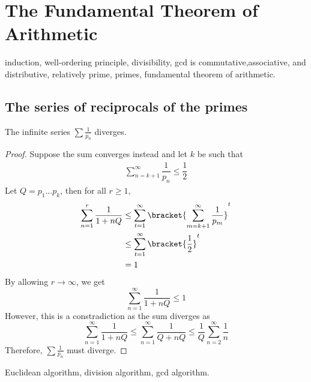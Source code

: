 \chapter{The Fundamental Theorem of Arithmetic}
induction, well-ordering principle, divisibility, gcd is commutative,associative, and distributive, relatively prime, primes, fundamental theorem of arithmetic.
\section{The series of reciprocals of the primes}
\begin{theorem}
    The infinite series \(\sum \frac{1}{p_n}\) diverges.
\end{theorem}
\begin{proof}
    Suppose the sum converges instead and let \(k\) be such that 
    \begin{align*}
        \sum_{n = k + 1}^{\infty} \dfrac{1}{p_n} \leq \dfrac{1}{2}
    \end{align*}
    Let \(Q = p_1 \dots p_k\), then for all \(r \geq 1\), 
    \begin{align*}
        \sum_{n = 1}^r \dfrac{1}{1 + nQ} &\leq \sum_{t =1}^{\infty} \bracket{\sum_{m = k + 1}^{\infty} \frac{1}{p_m}}^t\\
        & \leq \sum_{t =1}^{\infty} \bracket{\frac{1}{2}}^t\\
        & = 1\\
    \end{align*}
    By allowing \(r \to \infty\), we get 
    \begin{equation*}
        \sum_{n = 1}^{\infty} \dfrac{1}{1 + nQ} \leq 1
    \end{equation*}
    However, this is a constradiction as the sum diverges as 
    \begin{equation*}
    \sum_{n = 1}^{\infty} \dfrac{1}{1 + nQ} \leq \sum_{n = 1}^{\infty} \dfrac{1}{Q + nQ}  \leq \dfrac{1}{Q} \sum_{n = 2}^{\infty} \dfrac{1}{n} 
    \end{equation*}
    Therefore, \(\sum \frac{1}{p_n}\) must diverge.
\end{proof}
Euclidean algorithm, division algorithm, gcd algorithm.

